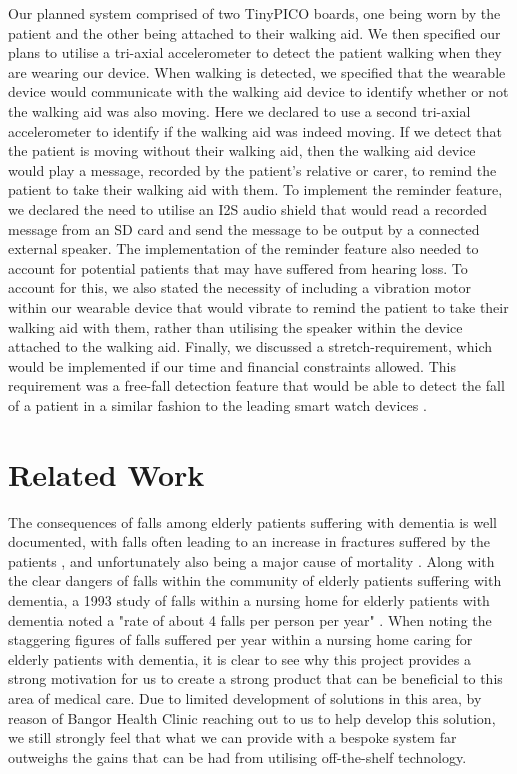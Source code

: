 Our planned system comprised of two TinyPICO boards, one being worn by the patient and the other being attached to their walking aid. We then specified our plans to utilise a tri-axial accelerometer to detect the patient walking when they are wearing our device. When walking is detected, we specified that the wearable device would communicate with the walking aid device to identify whether or not the walking aid was also moving. Here we declared to use a second tri-axial accelerometer to identify if the walking aid was indeed moving. If we detect that the patient is moving without their walking aid, then the walking aid device would play a message, recorded by the patient's relative or carer, to remind the patient to take their walking aid with them. To implement the reminder feature, we declared the need to utilise an I2S audio shield that would read a recorded message from an SD card and send the message to be output by a connected external speaker. The implementation of the reminder feature also needed to account for potential patients that may have suffered from hearing loss. To account for this, we also stated the necessity of including a vibration motor within our wearable device that would vibrate to remind the patient to take their walking aid with them, rather than utilising the speaker within the device attached to the walking aid. Finally, we discussed a stretch-requirement, which would be implemented if our time and financial constraints allowed. This requirement was a free-fall detection feature that would be able to detect the fall of a patient in a similar fashion to the leading smart watch devices \cite{samsung_watch, apple_watch}.

\section{Related Work}

The consequences of falls among elderly patients suffering with dementia is well documented, with falls often leading to an increase in fractures suffered by the patients \cite{buchner_1987}, and unfortunately also being a major cause of mortality \cite{shaw_2007}. Along with the clear dangers of falls within the community of elderly patients suffering with dementia, a 1993 study of falls within a nursing home for elderly patients with dementia noted a "rate of about 4 falls per person per year" \cite{van_dijk_meulenberg_van_de_sande_habbema_1993}. When noting the staggering figures of falls suffered per year within a nursing home caring for elderly patients with dementia, it is clear to see why this project provides a strong motivation for us to create a strong product that can be beneficial to this area of medical care. Due to limited development of solutions in this area, by reason of Bangor Health Clinic reaching out to us to help develop this solution, we still strongly feel that what we can provide with a bespoke system far outweighs the gains that can be had from utilising off-the-shelf technology. 

